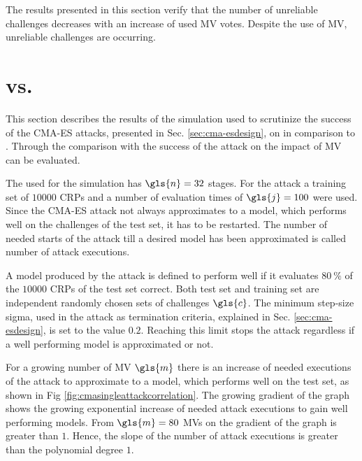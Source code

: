 The results presented in this section verify that the number of unreliable challenges decreases with an increase of used \ac{MV} votes.
Despite the use of \ac{MV}, unreliable challenges are occurring.


\section{\apufs vs. \mpufs}
\label{sec:arbitervsmajorityarbiter}

This section describes the results of the simulation used to scrutinize the success of the \ac{CMA-ES} attacks, presented in Sec. \ref{sec:cma-esdesign}, on \mpufs in comparison to \apufs.
Through the comparison with the success of the attack on \apuf the impact of \ac{MV} can be evaluated.

The \apuf used for the simulation has $\gls{n} = 32$ stages.
For the attack a training set of $10000$ \acp{CRP} and a number of evaluation times of $\gls{j} = 100$ were used.
Since the \ac{CMA-ES} attack not always approximates to a model, which performs well on the challenges of the test set, it has to be restarted.
The number of needed starts of the attack till a desired model has been approximated is called number of attack executions.

A model produced by the attack is defined to perform well if it evaluates $80\ \%$ of the $10000$ \acp{CRP} of the test set correct.
Both test set and training set are independent randomly chosen sets of challenges $\gls{c}$.
The minimum step-size sigma, used in the attack as termination criteria, explained in Sec. \ref{sec:cma-esdesign}, is set to the value $0.2$.
Reaching this limit stops the attack regardless if a well performing model is approximated or not.

For a growing number of \ac{MV} $\gls{m}$ there is an increase of needed executions of the attack to approximate to a model, which performs well on the test set, as shown in Fig \ref{fig:cmasingleattackcorrelation}.
The growing gradient of the graph shows the growing exponential increase of needed attack executions to gain well performing models.
From $\gls{m} = 80$ \acp{MV} on the gradient of the graph is greater than $1$.
Hence, the slope of the number of attack executions is greater than the polynomial degree $1$.

